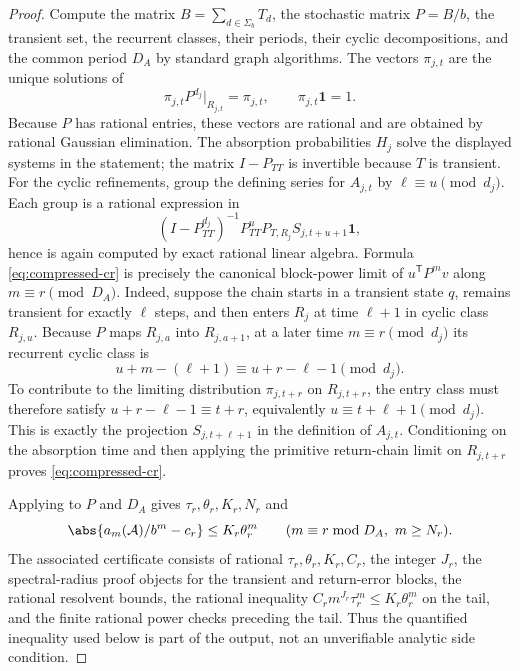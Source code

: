 \begin{proof}
  Compute the matrix \(B=\sum_{d\in\Sigma_b}T_d\), the stochastic matrix
  \(P=B/b\), the transient set, the recurrent classes, their periods,
  their cyclic decompositions, and the common period \(D_A\) by standard
  graph algorithms. The vectors \(\pi_{j,t}\) are the unique solutions
  of
  \[
    \pi_{j,t}P^{d_j}|_{R_{j,t}}=\pi_{j,t},
    \qquad
    \pi_{j,t}\mathbf 1=1.
  \]
  Because \(P\) has rational entries, these vectors are rational and
  are obtained by rational Gaussian elimination. The absorption
  probabilities \(H_j\) solve the displayed systems in the statement;
  the matrix \(I-P_{TT}\) is invertible because \(T\) is transient.
  For the cyclic refinements, group the defining series for
  \(A_{j,t}\) by \(\ell\equiv u\pmod{d_j}\). Each group is a
  rational expression in
  \[
    (I-P_{TT}^{d_j})^{-1}P_{TT}^uP_{T,R_j}S_{j,t+u+1}\mathbf 1,
  \]
  hence is again computed by exact rational linear algebra. Formula
  \eqref{eq:compressed-cr} is precisely the canonical block-power limit
  of \(u^{\mathsf T}P^m v\) along \(m\equiv r\pmod {D_A}\). Indeed,
  suppose the chain starts in a transient state \(q\), remains
  transient for exactly \(\ell\) steps, and then enters \(R_j\) at time
  \(\ell+1\) in cyclic class \(R_{j,u}\). Because \(P\) maps
  \(R_{j,a}\) into \(R_{j,a+1}\), at a later time
  \(m\equiv r\pmod {d_j}\) its recurrent cyclic class is
  \[
    u+m-(\ell+1)\equiv u+r-\ell-1 \pmod {d_j}.
  \]
  To contribute to the limiting distribution
  \(\pi_{j,t+r}\) on \(R_{j,t+r}\), the entry class must therefore
  satisfy \(u+r-\ell-1\equiv t+r\), equivalently
  \(u\equiv t+\ell+1\pmod {d_j}\). This is exactly the projection
  \(S_{j,t+\ell+1}\) in the definition of \(A_{j,t}\). Conditioning on
  the absorption time and then applying the primitive return-chain limit
  on \(R_{j,t+r}\) proves \eqref{eq:compressed-cr}.

  Applying  to \(P\) and
  \(D_A\) gives \(\tau_r,\theta_r,K_r,N_r\) and
  \[
    \abs{a_m(\mathcal A)/b^m-c_r}\le K_r\theta_r^m
    \qquad(m\equiv r\bmod {D_A},\ m\ge N_r).
  \]
  The associated certificate consists of rational
  \(\tau_r,\theta_r,K_r,C_r\), the integer \(J_r\), the
  spectral-radius proof objects for the transient and return-error
  blocks, the rational resolvent bounds, the rational inequality
  \(C_rm^{J_r}\tau_r^m\le K_r\theta_r^m\) on the tail, and the finite
  rational power checks preceding the tail. Thus the quantified
  inequality used below is part of the output, not an unverifiable
  analytic side condition.


\end{proof}
